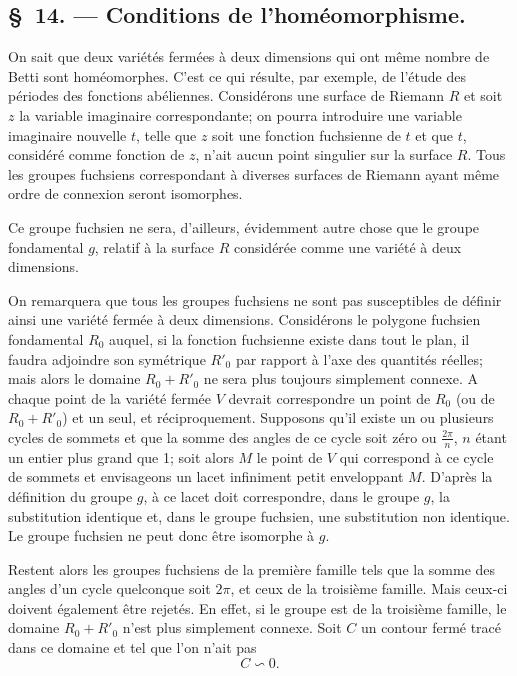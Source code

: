 \documentclass{article}
\begin{document}
\subsection*{\S~14. --- Conditions de l'homéomorphisme.}

On sait que deux variétés fermées à deux dimensions qui ont même nombre de Betti sont homéomorphes. C'est ce qui résulte, par exemple, de l'étude des périodes des fonctions abéliennes. Considérons une surface de Riemann $R$ et soit $z$ la variable imaginaire correspondante; on pourra introduire une variable imaginaire nouvelle $t$, telle que $z$ soit une fonction fuchsienne de $t$ et que $t$, considéré comme fonction de $z$, n'ait aucun point singulier sur la surface $R$. Tous les groupes fuchsiens correspondant à diverses surfaces de Riemann ayant même ordre de connexion seront isomorphes.

Ce groupe fuchsien ne sera, d'ailleurs, évidemment autre chose que le groupe fondamental $g$, relatif à la surface $R$ considérée comme une variété à deux dimensions.

On remarquera que tous les groupes fuchsiens ne sont pas susceptibles de définir ainsi une variété fermée à deux dimensions. Considérons le polygone fuchsien fondamental $R_{0}$ auquel, si la fonction fuchsienne existe dans tout le plan, il faudra adjoindre son symétrique $R'_{0}$ par rapport à l'axe des quantités réelles; mais alors le domaine $R_{0} + R'_{0}$ ne sera plus toujours simplement connexe. A chaque point de la variété fermée $V$ devrait correspondre un point de $R_{0}$ (ou de $R_{0} + R'_{0}$) et un seul, et réciproquement. Supposons qu'il existe un ou plusieurs cycles de sommets et que la somme des angles de ce cycle soit zéro ou $\frac{2\pi}{n}$, $n$ étant un entier plus grand que 1; soit alors $M$ le point de $V$ qui correspond à ce cycle de sommets et envisageons un lacet infiniment petit enveloppant $M$. D'après la définition du groupe $g$, à ce lacet doit correspondre, dans le groupe $g$, la substitution identique et, dans le groupe fuchsien, une substitution non identique. Le groupe fuchsien ne peut donc être isomorphe à $g$.

Restent alors les groupes fuchsiens de la première famille tels que la somme des angles d'un cycle quelconque soit $2\pi$, et ceux de la troisième famille. Mais ceux-ci doivent également être rejetés. En effet, si le groupe est de la troisième famille, le domaine $R_{0} + R'_{0}$ n'est plus simplement
connexe. Soit $C$ un contour fermé tracé dans ce domaine et tel que l'on n'ait pas
\[ C \backsim 0. \]
\end{document}
